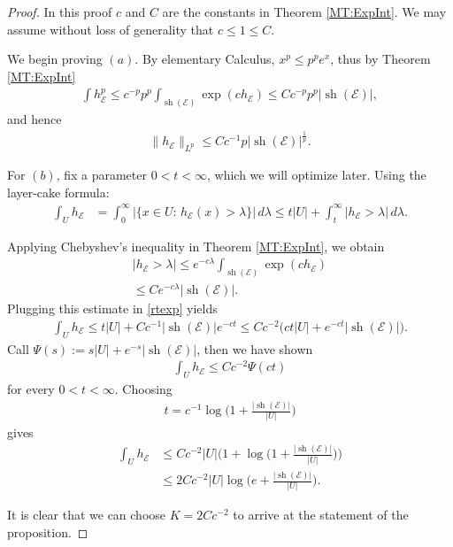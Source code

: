 \documentclass[oneside]{amsart}
\theoremstyle{definition}
\theoremstyle{plain}
\numberwithin{equation}{section}
\numberwithin{theorem}{section}
\newcommand{\sh}{\operatorname{sh}}
\begin{document}
\begin{proof}
  In this proof $c$ and $C$ are the constants in Theorem \ref{MT:ExpInt}.
  We may assume without loss of generality that $c \leq 1 \leq C$.

  We begin proving $(a)$. By elementary Calculus, $x^p \leq p^p e^x$, thus
  by Theorem \ref{MT:ExpInt}
  \begin{align*}
    \int h_{\mathcal{E}}^p \leq c^{-p}p^p \int_{\sh(\mathcal{E})}
    \exp(c h_{\mathcal{E}}) \leq C c^{-p} p^p |\sh(\mathcal{E})|,
  \end{align*}
  and hence
  \begin{align*}
    \|h_{\mathcal{E}}\|_{L^p} \leq C c^{-1} p
    |\sh(\mathcal{E})|^{\frac{1}{p}}.
  \end{align*}

  For $(b)$, fix a parameter $0 < t < \infty$, which we will optimize later.
  Using the layer-cake formula:
  \begin{align} \label{rtexp}
    \int_U h_{\mathcal{E}} &= \int_0^\infty |\{x \in U:\, h_{\mathcal{E}}(x) >
    \lambda \}| \, d\lambda \leq t|U| +
    \int_t^\infty |h_{\mathcal{E}} > \lambda| \, d\lambda.
  \end{align}

  Applying Chebyshev's inequality in Theorem \ref{MT:ExpInt}, we obtain
  \begin{align*}
    |h_{\mathcal{E}} > \lambda|
    \leq e^{-c \lambda} \int_{\sh(\mathcal{E})} \exp(c h_{\mathcal{E}}) \\
    \leq C e^{-c \lambda} |\sh(\mathcal{E})|.
  \end{align*}
  Plugging this estimate in \eqref{rtexp} yields
  \begin{align*}
    \int_{U} h_{\mathcal{E}} \leq t|U| +
    C c^{-1} |\sh(\mathcal{E})| e^{-c t}
    \leq C c^{-2} \Big( c t |U| + e^{-c t}|\sh(\mathcal{E})| \Big).
  \end{align*}
  Call $\Psi(s) := s|U| + e^{-s}|\sh(\mathcal{E})|$, then we have shown
  \begin{align*}
    \int_{U} h_{\mathcal{E}} \leq C c^{-2} \Psi(c t)
  \end{align*}
  for every $0 < t < \infty$. Choosing
  \begin{align*}
    t = c^{-1}\log\bigg( 1 + \frac{|\sh(\mathcal{E})|}{|U|} \bigg)
  \end{align*}
  gives
  \begin{align*}
    \int_{U} h_{\mathcal{E}} &\leq C c^{-2}
    |U|\bigg( 1 + \log\bigg(1+\frac{|\sh(\mathcal{E})|}{|U|} \bigg)\bigg) \\
    &\leq 2 C c^{-2}|U|\log\bigg( e + \frac{|\sh(\mathcal{E})|}{|U|} \bigg).
  \end{align*}

  It is clear that we can choose $K = 2C c^{-2}$ to arrive at the
  statement of the proposition.
\end{proof}
\end{document}
